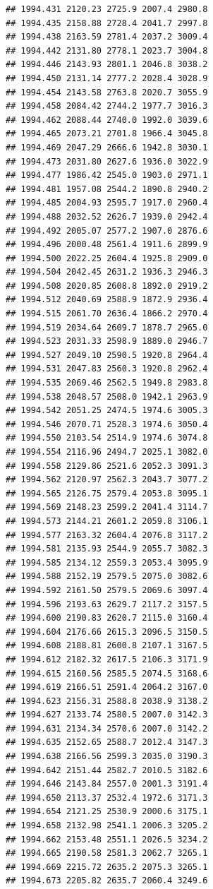 \documentclass[
]{book}
\begin{document}
\begin{verbatim}
## 1994.431 2120.23 2725.9 2007.4 2980.8
## 1994.435 2158.88 2728.4 2041.7 2997.8
## 1994.438 2163.59 2781.4 2037.2 3009.4
## 1994.442 2131.80 2778.1 2023.7 3004.8
## 1994.446 2143.93 2801.1 2046.8 3038.2
## 1994.450 2131.14 2777.2 2028.4 3028.9
## 1994.454 2143.58 2763.8 2020.7 3055.9
## 1994.458 2084.42 2744.2 1977.7 3016.3
## 1994.462 2088.44 2740.0 1992.0 3039.6
## 1994.465 2073.21 2701.8 1966.4 3045.8
## 1994.469 2047.29 2666.6 1942.8 3030.1
## 1994.473 2031.80 2627.6 1936.0 3022.9
## 1994.477 1986.42 2545.0 1903.0 2971.1
## 1994.481 1957.08 2544.2 1890.8 2940.2
## 1994.485 2004.93 2595.7 1917.0 2960.4
## 1994.488 2032.52 2626.7 1939.0 2942.4
## 1994.492 2005.07 2577.2 1907.0 2876.6
## 1994.496 2000.48 2561.4 1911.6 2899.9
## 1994.500 2022.25 2604.4 1925.8 2909.0
## 1994.504 2042.45 2631.2 1936.3 2946.3
## 1994.508 2020.85 2608.8 1892.0 2919.2
## 1994.512 2040.69 2588.9 1872.9 2936.4
## 1994.515 2061.70 2636.4 1866.2 2970.4
## 1994.519 2034.64 2609.7 1878.7 2965.0
## 1994.523 2031.33 2598.9 1889.0 2946.7
## 1994.527 2049.10 2590.5 1920.8 2964.4
## 1994.531 2047.83 2560.3 1920.8 2962.4
## 1994.535 2069.46 2562.5 1949.8 2983.8
## 1994.538 2048.57 2508.0 1942.1 2963.9
## 1994.542 2051.25 2474.5 1974.6 3005.3
## 1994.546 2070.71 2528.3 1974.6 3050.4
## 1994.550 2103.54 2514.9 1974.6 3074.8
## 1994.554 2116.96 2494.7 2025.1 3082.0
## 1994.558 2129.86 2521.6 2052.3 3091.3
## 1994.562 2120.97 2562.3 2043.7 3077.2
## 1994.565 2126.75 2579.4 2053.8 3095.1
## 1994.569 2148.23 2599.2 2041.4 3114.7
## 1994.573 2144.21 2601.2 2059.8 3106.1
## 1994.577 2163.32 2604.4 2076.8 3117.2
## 1994.581 2135.93 2544.9 2055.7 3082.3
## 1994.585 2134.12 2559.3 2053.4 3095.9
## 1994.588 2152.19 2579.5 2075.0 3082.6
## 1994.592 2161.50 2579.5 2069.6 3097.4
## 1994.596 2193.63 2629.7 2117.2 3157.5
## 1994.600 2190.83 2620.7 2115.0 3160.4
## 1994.604 2176.66 2615.3 2096.5 3150.5
## 1994.608 2188.81 2600.8 2107.1 3167.5
## 1994.612 2182.32 2617.5 2106.3 3171.9
## 1994.615 2160.56 2585.5 2074.5 3168.6
## 1994.619 2166.51 2591.4 2064.2 3167.0
## 1994.623 2156.31 2588.8 2038.9 3138.2
## 1994.627 2133.74 2580.5 2007.0 3142.3
## 1994.631 2134.34 2570.6 2007.0 3142.2
## 1994.635 2152.65 2588.7 2012.4 3147.3
## 1994.638 2166.56 2599.3 2035.0 3190.3
## 1994.642 2151.44 2582.7 2010.5 3182.6
## 1994.646 2143.84 2557.0 2001.3 3191.4
## 1994.650 2113.37 2532.4 1972.6 3171.3
## 1994.654 2121.25 2530.9 2000.6 3175.1
## 1994.658 2132.98 2541.1 2006.3 3205.2
## 1994.662 2153.48 2551.1 2026.5 3234.2
## 1994.665 2190.58 2581.3 2062.7 3265.1
## 1994.669 2215.72 2635.2 2075.3 3265.1
## 1994.673 2205.82 2635.7 2060.4 3249.6

\end{verbatim}
\end{document}
